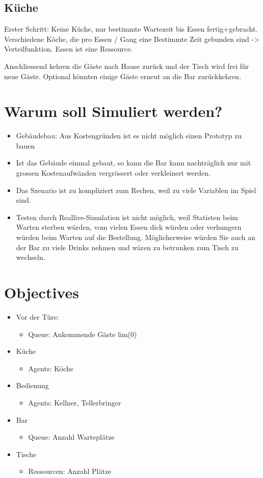 \documentclass[ngerman,a4paper,12pt]{scrreprt}
\begin{document}
\subsection{Küche}
Erster Schritt: Keine Küche, nur bestimmte Wartezeit bis Essen fertig+gebracht.
Verschiedene Köche, die pro Essen / Gang eine Bestimmte Zeit gebunden sind -> Verteilfunktion.
Essen ist eine Ressource.

Anschliessend kehren die Gäste nach Hause zurück und der Tisch wird frei für neue Gäste.
Optional könnten einige Gäste erneut an die Bar zurückkehren.


\section{Warum soll Simuliert werden?}
\begin{itemize}
	\item Gebäudebau: Aus Kostengründen ist es nicht möglich einen Prototyp zu bauen
	\item Ist das Gebäude einmal gebaut, so kann die Bar kann nachträglich nur mit grossen Kostenaufwänden vergrössert oder verkleinert werden.
	\item Das Szenario ist zu kompliziert zum Rechen, weil zu viele Variablen im Spiel sind.
	\item Testen durch Reallive-Simulation ist nicht möglich, weil Statisten beim Warten sterben würden, vom vielen Essen dick würden oder verhungern würden beim Warten auf die Bestellung. Möglicherweise würden Sie auch an der Bar zu viele Drinks nehmen und wären zu betrunken zum Tisch zu wechseln.
\end{itemize}

\section{Objectives}
\begin{itemize}
	\item Vor der Türe:
		\begin{itemize}
			\item Queue: Ankommende Gäste lim(0)
		\end{itemize}
	\item Küche
		\begin{itemize}
			\item Agents: Köche
		\end{itemize}
	\item Bedienung
		\begin{itemize}
			\item Agents: Kellner, Tellerbringer
		\end{itemize}
	\item Bar
		\begin{itemize}
			\item Queue: Anzahl Warteplätze
		\end{itemize}
	\item Tische
		\begin{itemize}
			\item Ressourcen: Anzahl Plätze
		\end{itemize}
\end{itemize}
\end{document}
